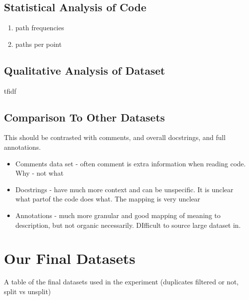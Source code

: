 
\subsection{Statistical Analysis of Code} %
\label{sub:statistical_analysis_of_code}

\begin{enumerate}
    \item path frequencies
    \item paths per point
\end{enumerate}


\subsection{Qualitative Analysis of Dataset} %
\label{sub:qualitative_analysis_}

tfidf

\subsection{Comparison To Other Datasets} %
\label{sub:comparison_to_other_datasets}

    This should be contrasted with comments, and overall docstrings, and full annotations.
    \begin{itemize}
        \item Comments data set - often comment is extra information when reading code. Why - not what
        \item Docstrings - have much more context and can be unspecific. It is unclear what partof the code does what. The mapping is very unclear
        \item Annotations - much more granular and good mapping of meaning to description, but not organic necessarily. DIfficult to source large dataset in.
    \end{itemize}


\section{Our Final Datasets} %
\label{sec:our_final_datasets}

A table of the final datasets used in the experiment (duplicates filtered or not, split vs unsplit)


